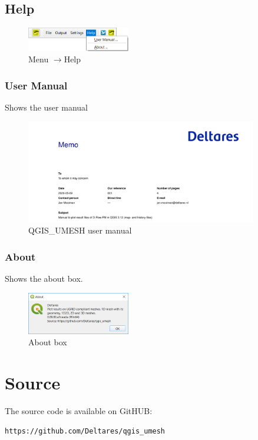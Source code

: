 \documentclass{deltares_memo}
\newcommand{\menuarrow}{$\rightarrow$}
\newcommand{\qumesh}{QGIS\_UMESH\xspace}
\begin{document}
\subsection{Help}
\phantom{m}\vspace{-\baselineskip}
\begin{figure}[H]
    \centering    
    \includegraphics[width=0.4\textwidth]{pictures/menu_help.png}
    \caption{Menu \menuarrow Help}
\end{figure}

\subsubsection{User Manual}
Shows the user manual
\begin{figure}[H]
	\centering    
	\includegraphics[width=0.9\textwidth]{pictures/menu_help_user_manual.png}
	\caption{\qumesh user manual}
\end{figure}

\subsubsection{About}
Shows the about box.
\begin{figure}[H]
    \centering    
    \includegraphics[width=0.4\textwidth]{pictures/menu_help_about.png}
    \caption{About box}
\end{figure}
\section{Source}
The source code is available on GitHUB:
\begin{Verbatim}
https://github.com/Deltares/qgis_umesh
\end{Verbatim}
\end{document}
